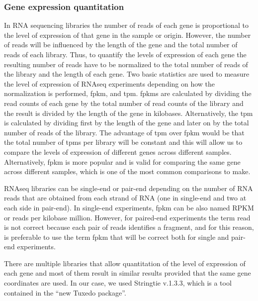 \subsubsection{Gene expression quantitation}
In RNA sequencing libraries the number of reads of each gene is proportional to the level of expression of that gene in the sample or origin. However, the number of reads will be influenced by the length of the gene and the total number of reads of each library. Thus, to quantify the levels of expression of each gene the resulting number of reads have to be normalized to the total number of reads of the library and the length of each gene. Two basic statistics are used to measure the level of expression of RNAseq experiments depending on how the normalization is performed, \gls{fpkm}, and \gls{tpm}. \glspl{fpkm} are calculated by dividing the read counts of each gene by the total number of read counts of the library and the result is divided by the length of the gene in kilobases. Alternatively, the \gls{tpm} is calculated by dividing first by the length of the gene and later on by the total number of reads of the library. The advantage of \gls{tpm} over \gls{fpkm} would be that the total number of \glspl{tpm} per library will be constant and this will allow us to compare the levels of expression of different genes across different samples. Alternatively, \gls{fpkm} is more popular and is valid for comparing the same gene across different samples, which is one of the most common comparisons to make.

RNAseq libraries can be single-end or pair-end depending on the number of RNA reads that are obtained from each strand of RNA (one in single-end and two at each side in pair-end). In single-end experiments, \gls{fpkm} can be also named RPKM or reads per kilobase million. However, for paired-end experiments the term read is not correct because each pair of reads identifies a fragment, and for this reason, is preferable to use the term \gls{fpkm} that will be correct both for single and pair-end experiments.

There are multiple libraries that allow quantitation of the level of expression of each gene and most of them result in similar results provided that the same gene coordinates are used. In our case, we used Stringtie v.1.3.3, which is a tool contained in the “new Tuxedo package”.\cite{Pertea2016}

